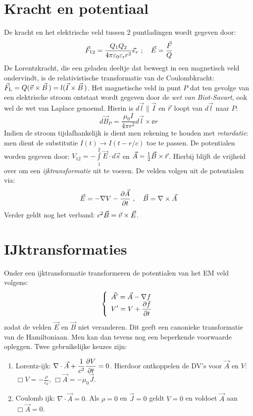 \documentclass[twoside]{report}
\begin{document}
\section{Kracht en potentiaal}
De kracht en het elektrische veld tussen 2 puntladingen wordt gegeven door:
\[
\vec{F}_{12}=\frac{Q_1Q_2}{4\pi\varepsilon_0\varepsilon_{\rm r}r^2}\vec{e}_{r}
~;~~~\vec{E}=\frac{\vec{F}}{Q}
\]
De Lorentzkracht, die een geladen deeltje dat beweegt in een magnetisch veld
ondervindt, is de relativistische transformatie van de Coulombkracht:
$\vec{F}_{\rm L}=Q(\vec{v}\times\vec{B}\,)=l(\vec{I}\times\vec{B}\,)$.
\npar
Het magnetische veld in punt $P$ dat ten gevolge van een elektrische stroom
ontstaat wordt gegeven door de {\it wet van Biot-Savart}, ook wel de wet van
Laplace genoemd. Hierin is $d\vec{l}\parallel\vec{I}$ en $\vec{r}$ loopt van
$d\vec{l}$ naar $P$:
\[
d\vec{B}_P=\frac{\mu_0I}{4\pi r^2}d\vec{l}\times\ee{r}
\]
Indien de stroom tijdafhankelijk is dient men rekening te houden met
{\it retardatie}: men dient de substitutie $I(t)\rightarrow I(t-r/c)$ toe te
passen.
\npar
De potentialen worden gegeven door:
$\displaystyle V_{12}=-\int\limits_1^2\vec{E}\cdot d\vec{s}$ en
$\vec{A}=\mbox{$\frac{1}{2}$}\vec{B}\times\vec{r}$.
\npar
Hierbij blijft de vrijheid over om een {\it ijktransformatie} uit te voeren.
De velden volgen uit de potentialen via:
\[
\vec{E}=-\nabla V-\frac{\partial \vec{A}}{\partial t}~,~~~\vec{B}=\nabla\times\vec{A}
\]
Verder geldt nog het verband: $c^2\vec{B}=\vec{v}\times\vec{E}$.

\section{IJktransformaties}
Onder een ijktransformatie transformeren de potentialen van het EM veld
volgens:
\[
\left\{\begin{array}{l}
\vec{A}'=\vec{A}-\nabla f\\
\displaystyle V'=V+\frac{\partial f}{\partial t}
\end{array}\right.
\]
zodat de velden $\vec{E}$ en $\vec{B}$ niet veranderen. Dit geeft een
canonieke transformatie van de Hamiltoniaan. Men kan dan tevens nog een
beperkende voorwaarde opleggen. Twee gebruikelijke keuzes zijn:
\begin{enumerate}
\item Lorentz-ijk: $\displaystyle\nabla\cdot\vec{A}+\frac{1}{c^2}\frac{\partial V}{\partial t}=0$.
      Hierdoor ontkoppelen de DV's voor $\vec{A}$ en $V$:
      $\displaystyle\Box V=-\frac{\rho}{\varepsilon_0}$, $\Box\vec{A}=-\mu_0\vec{J}$.
\item Coulomb ijk: $\nabla\cdot\vec{A}=0$. Als $\rho=0$ en $\vec{J}=0$ geldt
      $V=0$ en voldoet $\vec{A}$ aan $\Box\vec{A}=0$.
\end{enumerate}
\end{document}

